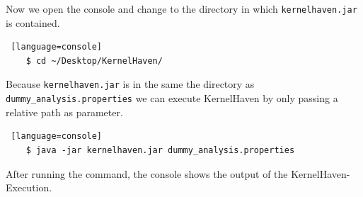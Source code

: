 Now we open the console and change to the directory in which \texttt{kernelhaven.jar} is contained. 

\begin{lstlisting} [language=console]
    $ cd ~/Desktop/KernelHaven/
\end{lstlisting}


Because \texttt{kernelhaven.jar} is in the same the directory as \texttt{dummy\_analysis.properties} we can execute KernelHaven by only passing a relative path as parameter.

\begin{lstlisting} [language=console]
    $ java -jar kernelhaven.jar dummy_analysis.properties
\end{lstlisting}

After running the command, the console shows the output of the KernelHaven-Execution.
